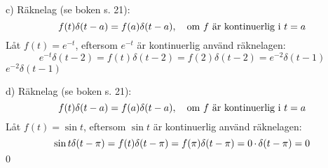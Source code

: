 \begin{task}{c)}
	Räknelag (se boken s. 21):
	\[f(t)\delta(t-a)=f(a)\delta(t-a), \quad \text{om } f \text{ är kontinuerlig i }t=a\]
	Låt $f(t)=e^{-t}$, eftersom $e^{-t}$ är kontinuerlig använd räknelagen:
	\[e^{-t}\delta(t-2)=
	f(t)\delta(t-2)=
	f(2)\delta(t-2)=
	e^{-2}\delta(t-1)\]
	\ans $e^{-2}\delta(t-1)$
\end{task}

\begin{task}{d)}
	Räknelag (se boken s. 21):
	\[f(t)\delta(t-a)=f(a)\delta(t-a), \quad \text{om } f \text{ är kontinuerlig i }t=a\]
	Låt $f(t)=\sin t$, eftersom $\sin t$ är kontinuerlig använd räknelagen:
	\[\sin t\delta(t-\pi)=
	f(t)\delta(t-\pi)=
	f(\pi)\delta(t-\pi)=
	0\operatorname{\cdot}\delta(t-\pi)=
	0\]
	\ans $0$
\end{task}